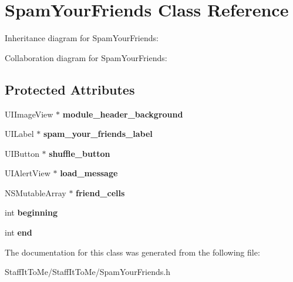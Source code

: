 \hypertarget{interface_spam_your_friends}{
\section{\-Spam\-Your\-Friends \-Class \-Reference}
\label{interface_spam_your_friends}
}


\-Inheritance diagram for \-Spam\-Your\-Friends\-:


\-Collaboration diagram for \-Spam\-Your\-Friends\-:
\subsection*{\-Protected \-Attributes}
\begin{DoxyCompactItemize}
\item 
\hypertarget{interface_spam_your_friends_ad5ab05487bf0400b3ead3d995afd7795}{
\-U\-I\-Image\-View $\ast$ {\bfseries module\-\_\-header\-\_\-background}}
\label{interface_spam_your_friends_ad5ab05487bf0400b3ead3d995afd7795}

\item 
\hypertarget{interface_spam_your_friends_a818f3ee859b9e30f18408205233e2f4d}{
\-U\-I\-Label $\ast$ {\bfseries spam\-\_\-your\-\_\-friends\-\_\-label}}
\label{interface_spam_your_friends_a818f3ee859b9e30f18408205233e2f4d}

\item 
\hypertarget{interface_spam_your_friends_a64c3e76fc56af0c83f36087d3ab7469c}{
\-U\-I\-Button $\ast$ {\bfseries shuffle\-\_\-button}}
\label{interface_spam_your_friends_a64c3e76fc56af0c83f36087d3ab7469c}

\item 
\hypertarget{interface_spam_your_friends_a258431f3b3c4f3e53b2dbabcb3f4da8f}{
\-U\-I\-Alert\-View $\ast$ {\bfseries load\-\_\-message}}
\label{interface_spam_your_friends_a258431f3b3c4f3e53b2dbabcb3f4da8f}

\item 
\hypertarget{interface_spam_your_friends_affb23556621d139918ae03f953907c8b}{
\-N\-S\-Mutable\-Array $\ast$ {\bfseries friend\-\_\-cells}}
\label{interface_spam_your_friends_affb23556621d139918ae03f953907c8b}

\item 
\hypertarget{interface_spam_your_friends_ad9a6cd09a470f7fe75b4b5d83215726e}{
int {\bfseries beginning}}
\label{interface_spam_your_friends_ad9a6cd09a470f7fe75b4b5d83215726e}

\item 
\hypertarget{interface_spam_your_friends_a5083ea08e67dcf14d9358e8c0a0062a9}{
int {\bfseries end}}
\label{interface_spam_your_friends_a5083ea08e67dcf14d9358e8c0a0062a9}

\end{DoxyCompactItemize}


\-The documentation for this class was generated from the following file\-:\begin{DoxyCompactItemize}
\item 
\-Staff\-It\-To\-Me/\-Staff\-It\-To\-Me/\-Spam\-Your\-Friends.\-h\end{DoxyCompactItemize}
